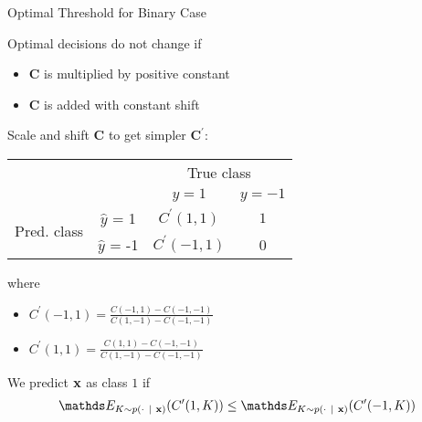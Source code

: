\documentclass[11pt,compress,t,notes=noshow, xcolor=table]{beamer}
\begin{document}
\begin{vbframe}{Optimal Threshold for Binary Case}
		\begin{itemize}
            \item Optimal decisions do not change if 
            \begin{itemize}
                \item $\mathbf{C}$ is multiplied by positive constant
                \item $\mathbf{C}$ is added with constant shift
            \end{itemize}

            \item Scale and shift $\mathbf{C}$ to get simpler $\mathbf{C}^\prime$: 
            \begin{table}[]
                \centering
                    \begin{tabular}{cc|cc}
        			& &\multicolumn{2}{c}{True class} \\
        			& & $y=1$ & $y=-1$  \\
        			\hline
        			\multirow{2}{*}{\parbox{0.5cm}{Pred.  class}} & $\hat y$ = 1 & $C^\prime(1,1)$ & $1$ \\
        			& $\hat y$ = -1 & $C^\prime(-1, 1)$ & 0\\
                \end{tabular}
            \end{table}
            where 
            \begin{itemize}
                \footnotesize
                \item $C^\prime (-1, 1) = \frac{C(-1, 1) - C(-1, -1)}{C(1, -1) - C(-1, -1)}$
                \item $C^\prime (1, 1) = \frac{C(1, 1) - C(-1, -1)}{C(1, -1) - C(-1,-1)}$
            \end{itemize}

\footnotesize{

            \item We predict $\mathbf{x}$ as class $1$ if \\
            \begin{align*}
                \E_{K \sim p(\cdot ~|~ \xv)}( C^\prime(1,K) )  \leq \E_{K \sim p(\cdot ~|~ \xv)}( C^\prime(-1,K) ) \\
            \end{align*}



}
\end{itemize}
\end{vbframe}
\end{document}
